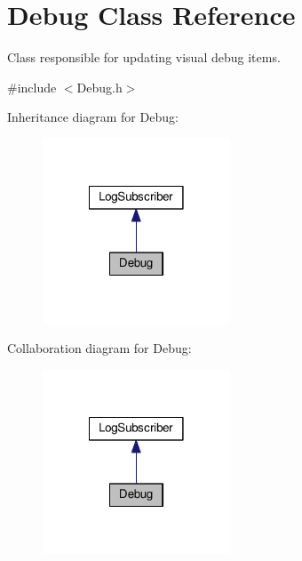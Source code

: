\hypertarget{classDebug}{\section{Debug Class Reference}
\label{classDebug}
}


Class responsible for updating visual debug items.  




{\ttfamily \#include $<$Debug.\-h$>$}



Inheritance diagram for Debug\-:
\nopagebreak
\begin{figure}[H]
\begin{center}
\leavevmode
\includegraphics[width=158pt]{classDebug__inherit__graph}
\end{center}
\end{figure}


Collaboration diagram for Debug\-:
\nopagebreak
\begin{figure}[H]
\begin{center}
\leavevmode
\includegraphics[width=158pt]{classDebug__coll__graph}
\end{center}
\end{figure}
